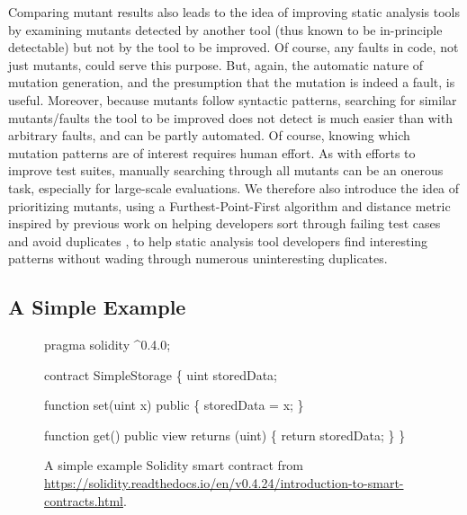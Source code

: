 Comparing mutant results also leads to the idea of improving static analysis tools by examining mutants detected by another tool (thus known to be in-principle detectable) but not by the tool to be improved.  Of course, any faults in code, not just mutants, could serve this purpose.  But, again, the automatic nature of mutation generation, and the presumption that the mutation is indeed a fault, is useful.  Moreover, because mutants follow syntactic patterns, searching for similar mutants/faults the tool to be improved does not detect is much easier than with arbitrary faults, and can be partly automated.  Of course, knowing which mutation patterns are of interest requires human effort.  As with efforts to improve test suites, manually searching through all mutants can be an onerous task, especially for large-scale evaluations.  We therefore also introduce the idea of prioritizing mutants, using a Furthest-Point-First \cite{Gonzalez} algorithm and distance metric inspired by previous work on helping developers sort through failing test cases and avoid duplicates \cite{PLDI13}, to help static analysis tool developers find interesting patterns without wading through numerous uninteresting duplicates.

\subsection{A Simple Example}

\begin{figure}
{\scriptsize
\begin{code}
pragma solidity ^0.4.0;

contract SimpleStorage \{
    uint storedData;

    function set(uint x) public \{
        storedData = x;
    \}

    function get() public view returns (uint) \{
        return storedData;
    \}
  \}
\end{code}
}
\caption{A simple example Solidity smart contract from \url{https://solidity.readthedocs.io/en/v0.4.24/introduction-to-smart-contracts.html}.}
\label{fig:sol424intro}
\end{figure}

